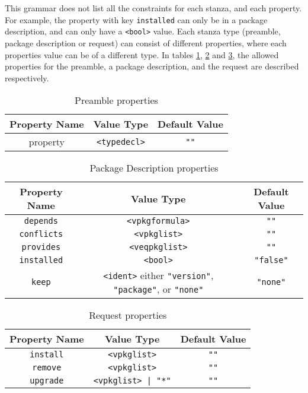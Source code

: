 This grammar does not list all the constraints for each stanza, and each property.
For example, the property with key \verb+installed+ can only be in a package description, and can only have a \verb+<bool>+ value.
Each stanza type (preamble, package description or request) can consist of different properties, where each properties value can be of a different type.
In tables \ref{formal.cudfpremableprops}, \ref{formal.cudfpdprops} and \ref{formal.cudfrequestprops}, 
the allowed properties for the preamble, a package description, and the request are described respectively.

\begin{table}[h]
\begin{tabular}{|c|c|c|}
\hline
Property Name & Value Type & Default Value \\ \hline
property & \verb+<typedecl>+ & \verb+""+ \\\hline
\end{tabular}
\caption{Preamble properties}
\label{formal.cudfpremableprops}
\end{table}

\begin{table}[h]
\begin{tabular}{|c|c|c|}
\hline
Property Name & Value Type & Default Value \\ \hline
\texttt{depends} & \texttt{<vpkgformula>} & \verb+""+ \\
\texttt{conflicts} & \texttt{<vpkglist>} & \verb+""+ \\ 
\texttt{provides} & \texttt{<veqpkglist>} & \verb+""+ \\ 
\texttt{installed} & \texttt{<bool>} & \verb+"false"+ \\ 
\texttt{keep} & \texttt{<ident>} either \texttt{"version"}, \texttt{"package"}, or \texttt{"none"} & \texttt{"none"} \\ \hline
\end{tabular}
\caption{Package Description properties}
\label{formal.cudfpdprops}
\end{table}

\begin{table}[h]
\begin{tabular}{|c|c|c|}
\hline
Property Name & Value Type & Default Value \\ \hline
\texttt{install} & \verb+<vpkglist>+ & \verb+""+ \\ 
\texttt{remove} & \verb+<vpkglist>+ & \verb+""+ \\ 
\texttt{upgrade} & \verb+<vpkglist> | "*"+ & \verb+""+ \\ \hline
\end{tabular}
\caption{Request properties}
\label{formal.cudfrequestprops}
\end{table}

